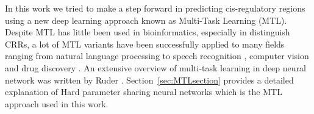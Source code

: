 In this work we tried to make a step forward in predicting cis-regulatory
regions using a new deep learning approach known as Multi-Task Learning
(MTL). Despite MTL has little been used in bioinformatics,
especially in distinguish CRRs, a lot of MTL variants have been successfully applied to many
fields ranging from natural language processing \cite{CollobertWeston2008} to speech recognition \cite{Deng2013}, computer vision \cite{Girshick2015} and drug discovery \cite{Ramsundar2015}. An extensive overview of multi-task learning in deep neural network was written by Ruder \cite{Ruder2017}. Section~\ref{sec:MTLsection} provides a detailed explanation of Hard parameter sharing neural networks which is the MTL approach used in this work.